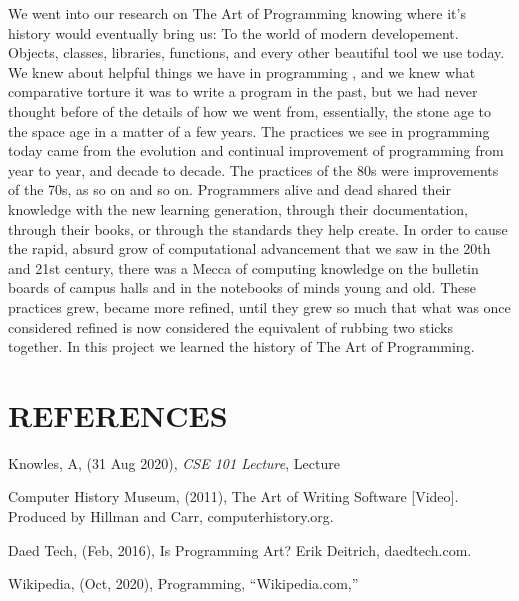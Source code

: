 \documentclass[letterpaper, 10 pt, conference]{IEEEconf}
\begin{document}
We went into our research on The Art of Programming knowing where it's 
history would
eventually bring us: To the world of modern developement. Objects, 
classes, libraries, functions, and every other beautiful tool we use
today. We knew about helpful things we have in programming
, and we knew what comparative torture it was to write a program in 
the past, but we had never thought before of the details of how we went
from, essentially, the stone age to the space age in a matter of a few years.
The practices we see in programming today came from the
evolution and continual improvement of programming from year to year, and
decade to decade. The practices of the 80s were improvements of the 70s, as so on and so on. 
Programmers alive and dead shared their knowledge with the new learning generation, through
their documentation, through their books, or through the standards they help create. 
In order to cause the rapid, absurd grow of computational advancement that we saw in the 20th and
21st century, there was a Mecca of computing knowledge on the bulletin
boards of campus halls and in the notebooks of minds young and old.
These practices grew, became more refined, until they grew so much that what was once considered
refined is now considered the equivalent of rubbing two sticks together.
In this project we learned the history of The Art of Programming.

\section*{REFERENCES}


\begin{enumerate}[label={[\arabic*]}]
\item Knowles, A, (31 Aug 2020), \emph{CSE 101 Lecture}, Lecture
\item Computer History Museum, (2011),
The Art of Writing Software [Video].
Produced by Hillman and Carr, computerhistory.org.
\item Daed Tech, (Feb, 2016),
Is Programming Art? Erik Deitrich, daedtech.com.
\item Wikipedia, (Oct, 2020),
Programming, ``Wikipedia.com,''
\end{enumerate}
\end{document}
